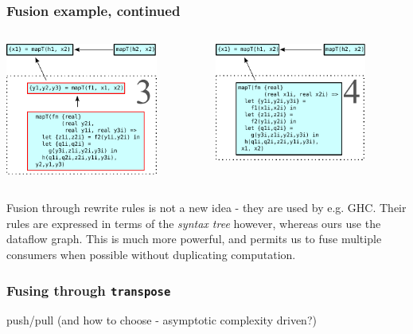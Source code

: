 \documentclass{beamer}
\begin{document}
\begin{frame}[t]
  \frametitle{Fusion example, continued}

  \centering
  \begin{columns}
    \begin{column}[T]{0.48\textwidth}
      \includegraphics[width=5cm]{img/fusion-3.pdf}
    \end{column}\hfill
    \begin{column}[T]{0.48\textwidth}
      \includegraphics[width=5cm]{img/fusion-4.pdf}
    \end{column}
  \end{columns}

  Fusion through rewrite rules is not a new idea - they are used by
  e.g.  GHC.  Their rules are expressed in terms of the \textit{syntax
    tree} however, whereas ours use the dataflow graph.  This is much
  more powerful, and permits us to fuse multiple consumers when
  possible without duplicating computation.

\end{frame}

\begin{frame}[fragile]
\frametitle{Fusing through \texttt{transpose}}

push/pull (and how to choose - asymptotic complexity driven?)
\end{frame}
\end{document}
